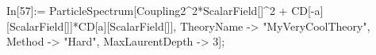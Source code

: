 In[57]:= ParticleSpectrum[Coupling2^2*ScalarField[]^2 + CD[-a][ScalarField[]]*CD[a][ScalarField[]], TheoryName -> "MyVeryCoolTheory", Method -> "Hard", MaxLaurentDepth -> 3]; 